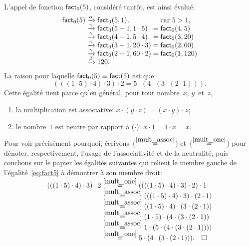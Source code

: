 L'appel de fonction \(\textsf{fact}_0(5)\), considéré tantôt, est ainsi
évalué:
\begin{equation*}
\begin{array}{r@{\;}c@{\;}l@{\;}c@{\;}l}
\fun{fact}_0(5)
& \xrightarrow{\smash[t]{\alpha}} & \fun{fact}_0(5,1),
&& \text{car \(5 > 1\)},\\
& \xrightarrow{\smash[t]{\gamma}} & \fun{fact}_0(5-1,1 \cdot 5)
& = & \fun{fact}_0(4,5)\\
& \xrightarrow{\smash[t]{\gamma}} & \fun{fact}_0(4-1,5 \cdot 4)
& = & \fun{fact}_0(3,20)\\
& \xrightarrow{\smash[t]{\gamma}} & \fun{fact}_0(3-1,20 \cdot 3)
& = & \fun{fact}_0(2,60)\\
& \xrightarrow{\smash[t]{\gamma}} & \fun{fact}_0(2-1,60 \cdot 2)
& = & \fun{fact}_0(1,120)\\
& \xrightarrow{\smash[t]{\beta}} & 120.
\end{array}
\end{equation*}
La raison pour laquelle \(\textsf{fact}_0(5) \equiv \textsf{fact}(5)\) est
que
\begin{equation}
  (((1 \cdot 5) \cdot 4) \cdot 3) \cdot 2
= 5 \cdot (4 \cdot (3 \cdot (2 \cdot 1))).\label{eq:fact5}
\end{equation}
Cette égalité tient parce qu'en général, pour tout nombre~\(x\), \(y\)~et~\(z\),
\begin{enumerate}

\item \label{mult_assoc} la multiplication est associative: \(x \cdot
  (y \cdot z) = (x \cdot y) \cdot z\);

\item \label{mult_one} le nombre~\(1\) est neutre par rapport à
  (\(\cdot\)): \(x \cdot 1 = 1 \cdot x = x\).

\end{enumerate}
Pour voir précisément pourquoi, écrivons~(\(\mathrel{\stackrel{\smash{\ref{mult_assoc}}}{=}}\))
et~(\(\mathrel{\stackrel{\smash{\ref{mult_one}}}{=}}\)) pour dénoter, respectivement, l'usage de
l'associativité et de la neutralité, puis couchons sur le papier les
égalités suivantes qui relient le membre gauche de
l'égalité~\eqref{eq:fact5} à démontrer à son membre droit:
\begin{align*}
  (((1 \cdot 5) \cdot 4) \cdot 3) \cdot 2
  &\mathrel{\stackrel{\smash{\smash{\ref{mult_one}}}}{=}} ((((1 \cdot 5) \cdot 4) \cdot 3) \cdot
  2) \cdot 1\\
  &\mathrel{\stackrel{\smash{\smash{\ref{mult_assoc}}}}{=}} (((1 \cdot 5) \cdot 4) \cdot 3)
  \cdot (2 \cdot 1)\\
  &\mathrel{\stackrel{\smash{\smash{\ref{mult_assoc}}}}{=}} ((1 \cdot 5) \cdot 4) \cdot (3 \cdot (2
    \cdot 1))\\
  &\mathrel{\stackrel{\smash{\smash{\ref{mult_assoc}}}}{=}} (1 \cdot 5) \cdot (4 \cdot (3 \cdot
  (2 \cdot 1))\\
  &\mathrel{\stackrel{\smash{\smash{\ref{mult_assoc}}}}{=}} 1 \cdot (5 \cdot (4 \cdot (3 \cdot
  (2 \cdot 1))))\\
  &\mathrel{\stackrel{\smash{\smash{\ref{mult_one}}}}{=}} 5 \cdot (4 \cdot (3 \cdot (2 \cdot
  1))).\quad \Box
\end{align*}
